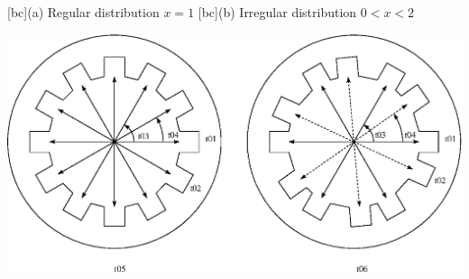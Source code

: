 \begin{psfrags}%
\psfragscanon

[bc]{(a) Regular distribution $x=1$}
[bc]{(b) Irregular distribution $0<x<2$}

\includegraphics[width=1.00\textwidth]{figs/f_slotstar.eps}
\end{psfrags}%
